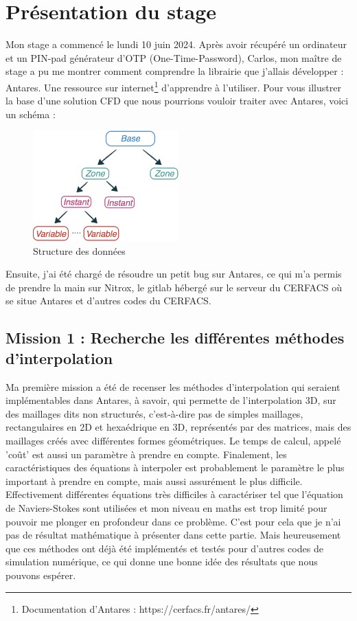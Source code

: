 \chapter{Présentation du stage}

Mon stage a commencé le lundi 10 juin 2024. Après avoir récupéré un ordinateur et un PIN-pad générateur d'OTP (One-Time-Password), Carlos, mon maître de stage a pu me montrer comment comprendre la librairie que j'allais développer : Antares. Une ressource sur internet\footnote{Documentation d'Antares : https://cerfacs.fr/antares/} d'apprendre à l'utiliser. Pour vous illustrer la base d'une solution CFD que nous pourrions vouloir traiter avec Antares, voici un schéma :

\begin{figure}[ht!]
    \centering
    \includegraphics[width=0.5\textwidth]{images/data_structure_1.png}
    \caption{Structure des données} %
\end{figure}


Ensuite, j'ai été chargé de résoudre un petit bug sur Antares, ce qui m'a permis de prendre la main sur Nitrox, le gitlab hébergé sur le serveur du CERFACS où se situe Antares et d'autres codes du CERFACS.

\section{Mission 1 : Recherche les différentes méthodes d'interpolation}
Ma première mission a été de recenser les méthodes d'interpolation qui seraient implémentables dans Antares, à savoir, qui permette de l'interpolation 3D, sur des maillages dits non structurés, c'est-à-dire pas de simples maillages, rectangulaires en 2D et hexaédrique en 3D, représentés par des matrices, mais des maillages créés avec différentes formes géométriques.
Le temps de calcul, appelé 'coût' est aussi un paramètre à prendre en compte.
Finalement, les caractéristiques des équations à interpoler est probablement le paramètre le plus important à prendre en compte, mais aussi assurément le plus difficile. Effectivement différentes équations très difficiles à caractériser tel que l'équation de Naviers-Stokes sont utilisées et mon niveau en maths est trop limité pour pouvoir me plonger en profondeur dans ce problème. C'est pour cela que je n'ai pas de résultat mathématique à présenter dans cette partie. Mais heureusement que ces méthodes ont déjà été implémentés et testés pour d'autres codes de simulation numérique, ce qui donne une bonne idée des résultats que nous pouvons espérer.

